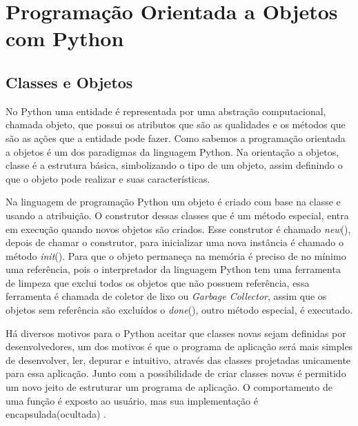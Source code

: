

\chapter{ Programação Orientada a Objetos com Python}



    \section{Classes e Objetos}
    
	 No Python uma entidade é representada por uma abstração computacional, chamada objeto, que possui os atributos que são as qualidades e os métodos que são as ações que a entidade pode fazer. Como sabemos a programação orientada a objetos é um dos paradigmas da linguagem Python. Na orientação a objetos, classe é a estrutura básica, simbolizando o tipo de um objeto, assim definindo o que o objeto pode realizar e suas características.
	 
	 Na linguagem de programação Python um objeto é criado com base na classe e usando a atribuição. O construtor dessas classes que é um método especial, entra em execução quando novos objetos são criados. Esse construtor é chamado \textunderscore \textit{new}\textunderscore(), depois de chamar o construtor, para inicializar uma nova instância é chamado o método \textunderscore \textit{init}\textunderscore(). Para que o objeto permaneça na memória é preciso de no mínimo uma referência, pois o interpretador da linguagem Python tem uma ferramenta de limpeza que exclui todos os objetos que não possuem referência, essa ferramenta é chamada de coletor de lixo ou \textit{Garbage Collector}, assim que os objetos sem referência são excluídos o \textunderscore \textit{done}\textunderscore(), outro método especial, é executado.
	 
	Há diversos motivos para o Python aceitar que classes novas sejam definidas por desenvolvedores, um dos motivos é que o programa de aplicação será mais simples de desenvolver, ler, depurar e intuitivo, através das classes projetadas unicamente para essa aplicação. Junto com a possibilidade de criar classes novas é permitido um novo jeito de estruturar um programa de aplicação. O comportamento de uma função é exposto ao usuário, mas sua implementação é encapsulada(ocultada) \cite{Borges2014}.
	
